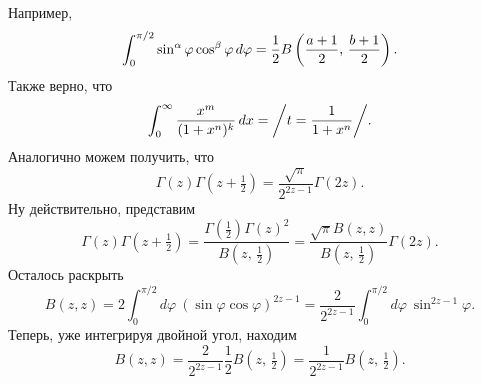 Например,
\begin{equation*}
    \int_0^{\pi/2} \sin^\alpha \varphi \cos^\beta \varphi \, d \varphi =  \frac{1}{2} B\left(\frac{a+1}{2},\, \frac{b+1}{2}\right).
\end{equation*}
Также верно, что
\begin{equation*}
    \int_{0}^{\infty}  \frac{x^m}{(1+x^n)^k} \, d x = \bigg/
        t = \frac{1}{1+x^n}
    \bigg/.
\end{equation*}
Аналогично можем получить, что
\begin{equation}
    \Gamma(z) \Gamma\left(z + \tfrac{1}{2}\right) = \frac{\sqrt{\pi}}{2^{2z-1}} \Gamma(2 z).
\end{equation}
Ну действительно, представим
\begin{equation*}
    \Gamma(z) \Gamma(z + \tfrac{1}{2}) = \frac{\Gamma(\frac{1}{2}) \Gamma(z)^2}{B(z,\, \tfrac{1}{2})} = 
    \frac{\sqrt{\pi} B(z, z)}{B(z,\, \frac{1}{2})} \Gamma(2z).
\end{equation*}
Осталось раскрыть
\begin{equation*}
    B(z, z) = 2 \int_{0}^{\pi/2} d \varphi\ \left(\sin \varphi \cos \varphi\right)^{2z-1} = 
    \frac{2}{2^{2z-1}} \int_{0}^{\pi/2} d \varphi \ \sin^{2 z-1} \varphi.
\end{equation*}
Теперь, уже интегрируя двойной угол, находим
\begin{equation*}
    B(z, z) = \frac{2}{2^{2z-1}} \frac{1}{2} B(z,\, \tfrac{1}{2}) = \frac{1}{2^{2z-1}} B(z,\, \tfrac{1}{2}).
\end{equation*}

